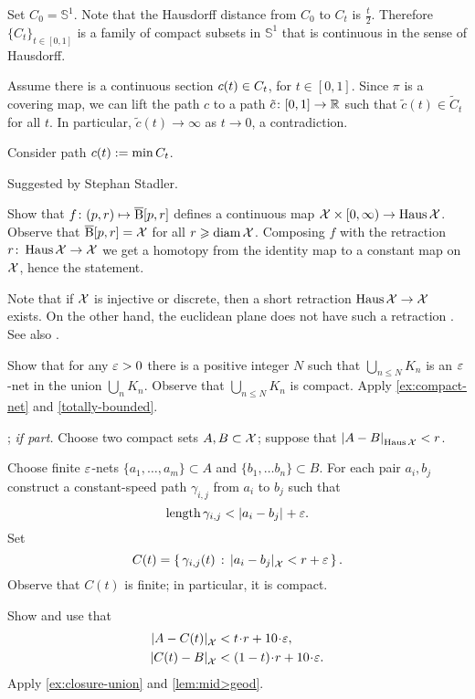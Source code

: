 Set $C_0=\mathbb{S}^1$.
Note that the Hausdorff distance from $C_0$ to $C_t$ is $\tfrac t2$.
Therefore $\{C_t\}_{t\in[0,1]}$ is a family of compact subsets in $\mathbb{S}^1$ that is continuous in the sense of Hausdorff.

Assume there is a continuous section $c(t)\z\in C_t$, for $t\in [0,1]$.
Since $\pi$ is a covering map,
we can lift the path $c$ to a path $\tilde c\colon[0,1]\to \mathbb{R}$ such that $\tilde c(t)\in \tilde C_t$ for all $t$.
In particular, $\tilde c(t)\to\infty$ as $t\to0$,
a contradiction.

Consider path $c(t)\mathrel{:=}\min C_t$.

 Suggested by Stephan Stadler.

Show that $f\colon(p,r)\mapsto \overline{\mathrm{B}}{}[p,r]$ defines a continuous map $\spc{X}\z\times[0,\infty)\to \Haus\spc{X}$.
Observe that $\overline{\mathrm{B}}{}[p,r]=\mathcal{X}$ for all $r\geqslant\operatorname{\rm diam}\nolimits\mathcal{X}$.
Composing $f$ with the retraction $r\colon\operatorname{\rm Haus}\nolimits\mathcal{X}\to \mathcal{X}$ we get a homotopy from the identity map to a constant map on $\mathcal{X}$, hence the statement.

Note that if $\mathcal{X}$ is injective or discrete, then a short retraction $\operatorname{\rm Haus}\nolimits\mathcal{X}\to \mathcal{X}$ exists.
On the other hand, the euclidean plane does not have such a retraction \cite{petrunin-2022-MO-center, przeslawski-yost}.
See also \cite{petrunin-435157}.

Show that for any $\varepsilon>0$ there is a positive integer $N$ such that $\bigcup_{n\le N} K_n$ is an $\varepsilon$-net in the union $\bigcup_{n} K_n$.
Observe that $\bigcup_{n\le N} K_n$
is compact.
Apply \ref{ex:compact-net} and \ref{totally-bounded}.

\parbf{\ref{ex:Haus-length}}; \textit{if part.}
Choose two compact sets $A,B\z\subset \spc{X}$;
suppose that $\dist{A}{B}{\Haus\spc{X}}<r$.

Choose finite $\varepsilon$-nets $\{a_1,\dots,a_m\}\subset A$ and $\{b_1,\dots b_n\}\subset B$.
For each pair $a_i,b_j$ construct a constant-speed path $\gamma_{i,j}$ from $a_i$ to $b_j$ such that 
\[\length \gamma_{i,j}<\dist{a_i}{b_j}{}+\eps.\]
Set 
\[C(t)=\set{\gamma_{i,j}(t)}{\dist{a_i}{b_j}{\spc{X}}<r+\eps}.\]
Observe that $C(t)$ is finite; in particular, it is compact.

Show and use that 
\begin{align*}
\dist{A}{C(t)}{\spc{X}}&<t\cdot r+10\cdot\eps,
\\
\dist{C(t)}{B}{\spc{X}}&<(1-t)\cdot r+10\cdot\eps.
\end{align*}
Apply \ref{ex:closure-union} and \ref{lem:mid>geod}.

